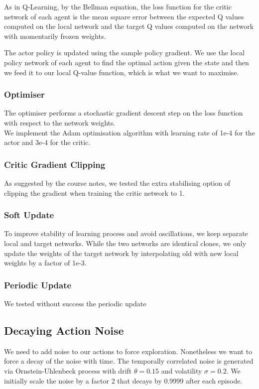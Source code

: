 \documentclass[pagenumber=off]{article}
\begin{document}
As in Q-Learning, by the Bellman equation, the loss function for the critic network  of each agent is the mean square error between the expected Q values computed on the local network and the target Q values computed on the network with momentarily frozen weights.

The actor policy is updated using the sample policy gradient. We use the local policy network of each agent to find the optimal action given the state and then we feed it to our local Q-value function, which is what we want to maximise. 

\subsubsection{Optimiser}

The optimiser performs a stochastic gradient descent step on the loss function with respect to the network weights.\\
We implement the Adam optimisation algorithm with learning rate of 1e-4 for the actor and 3e-4 for the critic.\\


\subsubsection{Critic Gradient Clipping}

As suggested by the course notes, we tested the extra stabilising option of clipping the gradient when training the critic network to 1.


\subsubsection{Soft Update}

To improve stability of learning process and avoid oscillations, we keep separate local and target networks. While the two networks are identical clones, we only update the weights of the target network by interpolating old with new local weights by a factor of 1e-3.

\subsubsection{Periodic Update}

We tested without success the periodic update  


\subsection{Decaying Action Noise}
We need to add noise to our actions to force exploration. Nonetheless we want to force a decay of the noise with time.
The temporally correlated noise is generated via Ornstein-Uhlenbeck process with drift $\theta=0.15$ and volatility $\sigma=0.2$.
We initially scale the noise by a factor 2 that decays by 0.9999 after each episode.
\end{document}

